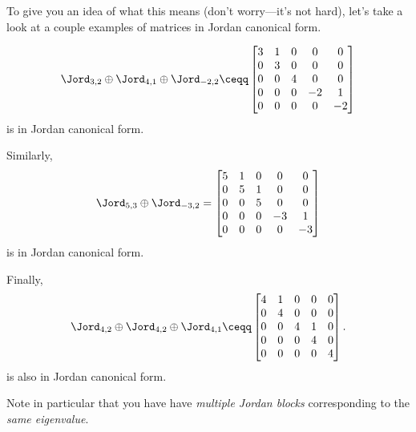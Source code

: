 To give you an idea of what this means (don't worry---it's not hard), let's take a look at a couple examples of matrices in Jordan canonical form.
\begin{exm}{}{}
	\begin{equation}
		\Jord _{3,2}\oplus \Jord _{4,1}\oplus \Jord _{-2,2}\ceqq \begin{bmatrix}3 & 1 & 0 & 0 & 0 \\ 0 & 3 & 0 & 0 & 0 \\ 0 & 0 & 4 & 0 & 0 \\ 0 & 0 & 0 & -2 & 1 \\ 0 & 0 & 0 & 0 & -2\end{bmatrix}
	\end{equation}
	is in Jordan canonical form.
	
	Similarly,
	\begin{equation}
		\Jord _{5,3}\oplus \Jord _{-3,2}=\begin{bmatrix}5 & 1 & 0 & 0 & 0 \\ 0 & 5 & 1 & 0 & 0 \\ 0 & 0 & 5 & 0 & 0 \\ 0 & 0 & 0 & -3 & 1 \\ 0 & 0 & 0 & 0 & -3\end{bmatrix}
	\end{equation}
	is in Jordan canonical form.
	
	Finally,
	\begin{equation}
		\Jord _{4,2}\oplus \Jord _{4,2}\oplus \Jord _{4,1}\ceqq \begin{bmatrix}4 & 1 & 0 & 0 & 0 \\ 0 & 4 & 0 & 0 & 0 \\ 0 & 0 & 4 & 1 & 0 \\ 0 & 0 & 0 & 4 & 0 \\ 0 & 0 & 0 & 0 & 4\end{bmatrix}.
	\end{equation}
	is also in Jordan canonical form.
	\begin{rmk}
		Note in particular that you have have \emph{multiple Jordan blocks} corresponding to the \emph{same eigenvalue}.
	\end{rmk}
\end{exm}
